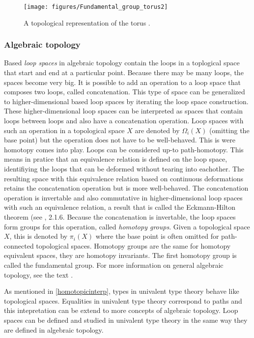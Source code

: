 \documentclass[12pt,a4paper,twoside,xetex]{book}
\newcommand{\keyword}[1]{\emph{#1}\index{#1}}
\begin{document}
\begin{figure}
\centering
\texttt{[image: figures/Fundamental\_group\_torus2]}
\caption{A topological representation of the torus \cite{Dinkelbach2005}. 
\label{torus}}
\end{figure}

\subsubsection{Algebraic topology}\label{higherhomotopy}

Based \keyword{loop spaces} in algebraic topology contain the loops in a toplogical space that start and end at a particular point. Because there may be many loops, the spaces become very big. It is possible to add an operation to a loop space that composes two loops, called concatenation. This type of space can be generalized to higher-dimensional based loop spaces by iterating the loop space construction. These higher-dimensional loop spaces can be interpreted as spaces that contain loops between loops and also have a concatenation operation. Loop spaces with such an operation in a topological space $X$ are denoted by $\Omega_i (X)$ (omitting the base point) but the operation does not have to be well-behaved. This is were homotopy comes into play. Loops can be considered up-to path-homotopy. This means in pratice that an equivalence relation is defined on the loop space, identifiying the loops that can be deformed without tearing into eachother. The resulting space with this equivalence relation based on continuous deformations retains the concatenation operation but is more well-behaved. The concatenation operation is invertable and also commutative in higher-dimensional loop spaces with such an equivalence relation, a result that is called the Eckmann-Hilton theorem (see \cite{Voevodsky2013}, 2.1.6. Because the concatenation is invertable, the loop spaces form groups for this operation, called \keyword{homotopy groups}. Given a topological space $X$, this is denoted by $\pi_i(X)$ where the base point is often omitted for path-connected topological spaces. Homotopy groups are the same for homotopy equivalent spaces, they are homotopy invariants. The first homotopy group is called the fundamental group. For more information on general 
algebraic topology, see the text \cite{Hatcher2001}.


As mentioned in \cref{homotopicinterp}, types in univalent type theory behave like topological spaces. Equalities in univalent type theory correspond to paths and this intepretation can be extend to more concepts of algebraic topology. Loop spaces can be defined and studied in univalent type theory in the same way they are defined in algebraic topology. 
\end{document}
